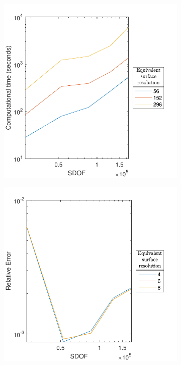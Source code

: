 \begin{figure}[ht]
     \centering
     \begin{subfigure}[b]{0.49\textwidth}
         \centering
         \includegraphics[width=\textwidth]{Images/KIFMM/Graphs/QuadPointsTime.pdf}
        \caption{\label{fig:QuadPointsTime}}
     \end{subfigure}
     \hfill
     \begin{subfigure}[b]{0.49\textwidth}
         \centering
         \includegraphics[width=\textwidth]{Images/KIFMM/Graphs/QuadPointsError.pdf}

\end{subfigure}
\end{figure}
